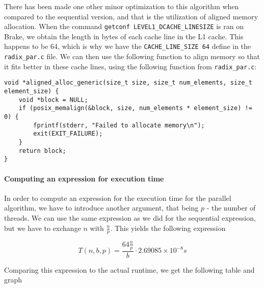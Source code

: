 \documentclass{article}
\begin{document}
There has been made one other minor optimization to this algorithm when compared to the sequential version, and that is the utilization of aligned memory allocation. When the command \texttt{getconf LEVEL1\_DCACHE\_LINESIZE} is ran on Brake, we obtain the length in bytes of each cache line in the L1 cache. This happens to be 64, which is why we have the \texttt{CACHE\_LINE\_SIZE 64} define in the \texttt{radix\_par.c} file. We can then use the following function to align memory so that it fits better in these cache lines, using the following function from \texttt{radix\_par.c}:

\begin{lstlisting}
void *aligned_alloc_generic(size_t size, size_t num_elements, size_t element_size) {
    void *block = NULL;
    if (posix_memalign(&block, size, num_elements * element_size) != 0) {
        fprintf(stderr, "Failed to allocate memory\n");
        exit(EXIT_FAILURE);
    }
    return block;
}
\end{lstlisting}

\paragraph{Computing an expression for execution time}
In order to compute an expression for the execution time for the parallel algorithm, we have to introduce another argument, that being \( p \) - the number of threads. We can use the same expression as we did for the sequential expression, but we have to exchange \( n \) with \( \frac{n}{p}  \). This yields the following expression

\[ T\left( n,b,p \right) = \frac{64 \frac{n}{p} }{b}\cdot 2.69085 \times 10^{-8}s \]

Comparing this expression to the actual runtime, we get the following table and graph

\testdata
\end{document}
